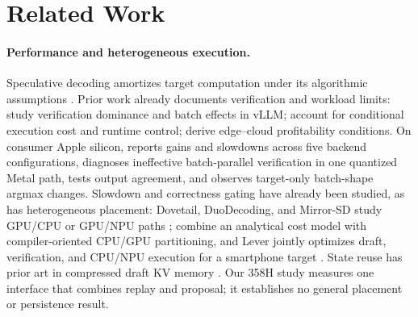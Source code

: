 \section{Related Work}
\label{sec:related}
\paragraph{Performance and heterogeneous execution.}
Speculative decoding amortizes target computation under its algorithmic assumptions \citep{leviathan2023}. Prior work already documents verification and workload limits: \citet{illusion} study verification dominance and batch effects in vLLM; \citet{specllm} account for conditional execution cost and runtime control; \citet{distance} derive edge--cloud profitability conditions. On consumer Apple silicon, \citet{lossless} reports gains and slowdowns across five backend configurations, diagnoses ineffective batch-parallel verification in one quantized Metal path, tests output agreement, and observes target-only batch-shape argmax changes. Slowdown and correctness gating have already been studied, as has heterogeneous placement: Dovetail, DuoDecoding, and Mirror-SD study GPU/CPU or GPU/NPU paths \citep{dovetail,duodecoding,mirror}; \citet{compilerassisted} combine an analytical cost model with compiler-oriented CPU/GPU partitioning, and Lever jointly optimizes draft, verification, and CPU/NPU execution for a smartphone target \citep{lever}. State reuse has prior art in compressed draft KV memory \citep{compactmemory}. Our 358H study measures one interface that combines replay and proposal; it establishes no general placement or persistence result.

